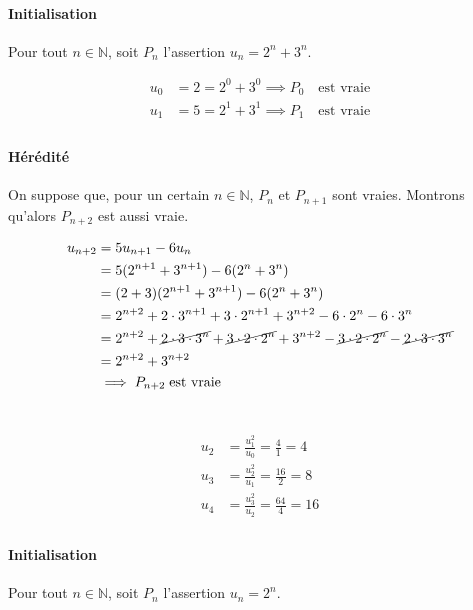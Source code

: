 \documentclass{article}
\newcommand{\N}{\mathds{N}}
\begin{document}
\paragraph{Initialisation} Pour tout $n \in \N$, soit $P_n$ l'assertion $u_n = 2^{n} + 3^{n}$.

\begin{align*}
	u_0 &= 2 = 2^{0} + 3^{0} \implies P_0\quad\text{est vraie} \\
	u_1 &= 5 = 2^{1} + 3^{1} \implies P_1\quad\text{est vraie} \\
\end{align*}

\paragraph{Hérédité} On suppose que, pour un certain $n \in \N$, $P_n$ et $P_{n+1}$ sont vraies. Montrons qu'alors $P_{n+2}$ est aussi vraie.

\begin{align*}
	u_{n+2} &= 5u_{n+1} - 6u_n \\
		&= 5(2^{n+1}+3^{n+1}) - 6(2^{n}+3^{n}) \\
		&= (2+3)(2^{n+1}+3^{n+1}) - 6(2^{n}+3^{n}) \\
		&= 2^{n+2}+2 \cdot 3^{n+1} + 3 \cdot 2^{n+1} + 3^{n+2} - 6 \cdot 2^{n} - 6 \cdot 3^{n} \\
		&= 2^{n+2} + \cancel{2 \cdot 3 \cdot 3^{n}} + \cancel{3 \cdot 2 \cdot 2^{n}} + 3^{n+2} - \cancel{3 \cdot 2 \cdot 2^{n}} - \cancel{2 \cdot 3 \cdot 3^{n}}\\
		&= 2^{n+2} + 3^{n+2} \\
		&\implies P_{n+2}\;\text{est vraie}
\end{align*}

\section{} %
\begin{align*}
	u_2 &= \frac{u_1^2}{u_0} = \frac{4}{1} = 4 \\
	u_3&= \frac{u_2^2}{u_1} = \frac{16}{2} = 8 \\
	u_4&= \frac{u_3^2}{u_2} = \frac{64}{4} = 16 \\
\end{align*}

\paragraph{Initialisation} Pour tout $n \in \N$, soit $P_n$ l'assertion $u_n = 2^n$.
\end{document}
